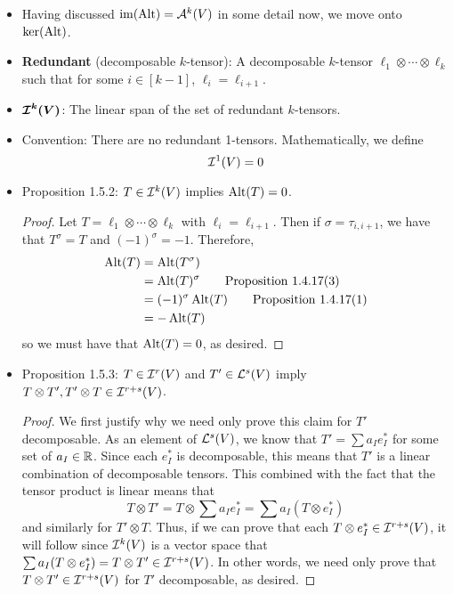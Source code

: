\documentclass[../notes.tex]{subfiles}
\begin{document}
\begin{itemize}
    \item {}Having discussed $\im(\Alt)=\alt[k]{V}$ in some detail now, we move onto $\ker(\Alt)$.
    \item \textbf{Redundant} (decomposable $k$-tensor): A decomposable $k$-tensor $\ell_1\otimes\cdots\otimes\ell_k$ such that for some $i\in[k-1]$, $\ell_i=\ell_{i+1}$.
    \item $\bm{\ide[k]{V}}$: The linear span of the set of redundant $k$-tensors.
    \item Convention: There are no redundant 1-tensors. Mathematically, we define
    \begin{equation*}
        \ide[1]{V} = 0
    \end{equation*}
    \item Proposition 1.5.2: $T\in\ide[k]{V}$ implies $\Alt(T)=0$.
    \begin{proof}
        Let $T=\ell_1\otimes\cdots\otimes\ell_k$ with $\ell_i=\ell_{i+1}$. Then if $\sigma=\tau_{i,i+1}$, we have that $T^\sigma=T$ and $(-1)^\sigma=-1$. Therefore,
        \begin{align*}
            \Alt(T) &= \Alt(T^\sigma)\\
            &= \Alt(T)^\sigma\tag*{Proposition 1.4.17(3)}\\
            &= (-1)^\sigma\Alt(T)\tag*{Proposition 1.4.17(1)}\\
            &= -\Alt(T)
        \end{align*}
        so we must have that $\Alt(T)=0$, as desired.
    \end{proof}
    \item Proposition 1.5.3: $T\in\ide[r]{V}$ and $T'\in\lin[s]{V}$ imply $T\otimes T',T'\otimes T\in\ide[r+s]{V}$.
    \begin{proof}
        We first justify why we need only prove this claim for $T'$ decomposable. As an element of $\lin[s]{V}$, we know that $T'=\sum a_Ie_I^*$ for some set of $a_I\in\R$. Since each $e_I^*$ is decomposable, this means that $T'$ is a linear combination of decomposable tensors. This combined with the fact that the tensor product is linear means that
        \begin{equation*}
            T\otimes T' = T\otimes\sum a_Ie_I^*
            = \sum a_I(T\otimes e_I^*)
        \end{equation*}
        and similarly for $T'\otimes T$. Thus, if we can prove that each $T\otimes e_I^*\in\ide[r+s]{V}$, it will follow since $\ide[k]{V}$ is a vector space that $\sum a_I(T\otimes e_I^*)=T\otimes T'\in\ide[r+s]{V}$. In other words, we need only prove that $T\otimes T'\in\ide[r+s]{V}$ for $T'$ decomposable, as desired.\par

\end{proof}
\end{itemize}
\end{document}
